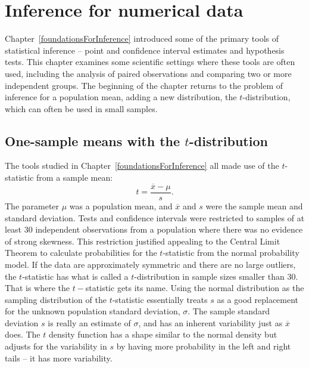 
\chapter{Inference for numerical data}
\label{inferenceForNumericalData}

Chapter~\ref{foundationsForInference} introduced some of the primary tools of statistical inference -- point and confidence  interval estimates and hypothesis tests.  This chapter examines some scientific settings where these tools are often used, including the analysis of paired observations and comparing two or more independent groups.  The beginning of the chapter returns to the problem of inference for a population mean, adding a new distribution, the $t$-distribution, which can often be used in small samples. 


\section{One-sample means with the $t$-distribution}
\label{oneSampleMeansWithTDistribution}

The tools studied in Chapter~\ref{foundationsForInference} all made use of the $t$-statistic from a sample mean:
\[
   t = \frac{\overline{x} - \mu}{s}.
\]
The parameter $\mu$ was a population mean, and $\overline{x}$ and $s$ were the sample mean and standard deviation.  Tests and confidence intervals were restricted to samples of at least 30 independent observations from a population where there was no evidence of strong skewness.  This restriction justified appealing to the Central Limit Theorem to calculate probabilities for the $t$-statistic from the normal probability model. If the data are approximately symmetric and there are no large outliers, the $t$-statistic has what is called a $t$-distribution in sample sizes smaller than 30.  That is where the $t-$statistic gets its name.  Using the normal distribution as the sampling distribution of the $t$-statistic essentially treats $s$ as a good replacement for the unknown population standard deviation, $\sigma$.  The sample standard deviation $s$ is really an estimate of $\sigma$, and has an inherent variability just as $\overline{x}$ does.  The $t$ density function has a shape  similar to the normal density but adjusts for the variability in $s$ by having more probability in the left and right tails -- it has more variability.


